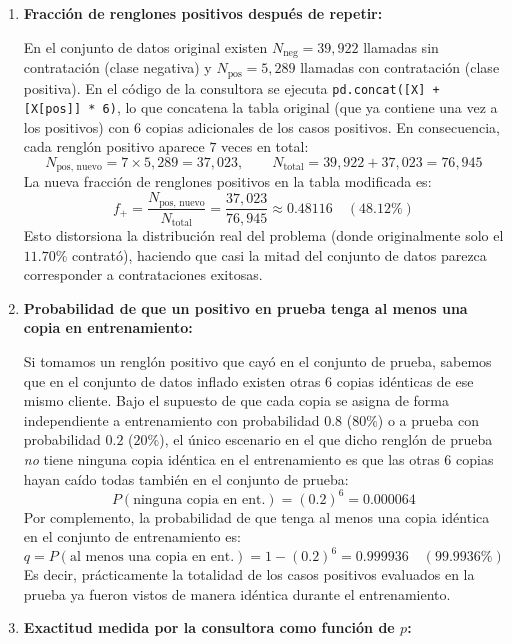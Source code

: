 \documentclass[11pt, letterpaper]{article}
\begin{document}
\begin{enumerate}[label=\textbf{\arabic*.}]
    \item \textbf{Fracción de renglones positivos después de repetir:}
    
    En el conjunto de datos original existen $N_{\text{neg}} = 39{,}922$ llamadas sin contratación (clase negativa) y $N_{\text{pos}} = 5{,}289$ llamadas con contratación (clase positiva). En el código de la consultora se ejecuta \texttt{pd.concat([X] + [X[pos]] * 6)}, lo que concatena la tabla original (que ya contiene una vez a los positivos) con $6$ copias adicionales de los casos positivos. En consecuencia, cada renglón positivo aparece $7$ veces en total:
    \[
        N_{\text{pos, nuevo}} = 7 \times 5{,}289 = 37{,}023, \qquad
        N_{\text{total}} = 39{,}922 + 37{,}023 = 76{,}945
    \]
    La nueva fracción de renglones positivos en la tabla modificada es:
    \[
        f_+ = \frac{N_{\text{pos, nuevo}}}{N_{\text{total}}} = \frac{37{,}023}{76{,}945} \approx 0.48116 \quad (48.12\%)
    \]
    Esto distorsiona la distribución real del problema (donde originalmente solo el $11.70\%$ contrató), haciendo que casi la mitad del conjunto de datos parezca corresponder a contrataciones exitosas.

    \item \textbf{Probabilidad de que un positivo en prueba tenga al menos una copia en entrenamiento:}
    
    Si tomamos un renglón positivo que cayó en el conjunto de prueba, sabemos que en el conjunto de datos inflado existen otras $6$ copias idénticas de ese mismo cliente. Bajo el supuesto de que cada copia se asigna de forma independiente a entrenamiento con probabilidad $0.8$ ($80\%$) o a prueba con probabilidad $0.2$ ($20\%$), el único escenario en el que dicho renglón de prueba \emph{no} tiene ninguna copia idéntica en el entrenamiento es que las otras $6$ copias hayan caído todas también en el conjunto de prueba:
    \[
        P(\text{ninguna copia en ent.}) = (0.2)^6 = 0.000064
    \]
    Por complemento, la probabilidad de que tenga al menos una copia idéntica en el conjunto de entrenamiento es:
    \[
        q = P(\text{al menos una copia en ent.}) = 1 - (0.2)^6 = 0.999936 \quad (99.9936\%)
    \]
    Es decir, prácticamente la totalidad de los casos positivos evaluados en la prueba ya fueron vistos de manera idéntica durante el entrenamiento.

    \item \textbf{Exactitud medida por la consultora como función de $p$:}
    

\end{enumerate}
\end{document}
